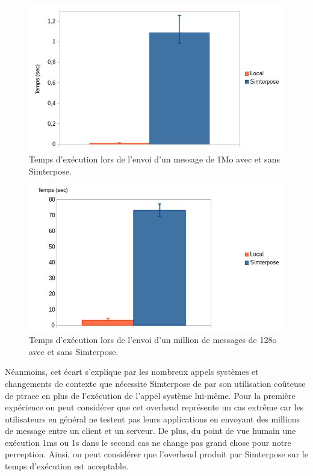 \begin{figure}
  \centering
    \includegraphics[scale=0.5]{mesures/graph/Bigmsg_local.jpg}
    \caption{Temps d'exécution lors de l'envoi d'un message de 1Mo avec et sans Simterpose.}
    \label{Network_Big_Local}
\end{figure}

\begin{figure}
  \centering
    \includegraphics[scale=0.5]{mesures/graph/Littlemsg_local.jpg}
    \caption{Temps d'exécution lors de l'envoi d'un million de messages de 128o avec et sans Simterpose.}
    \label{Network_Little_Local}
\end{figure}
  
Néanmoins, cet écart s'explique par les nombreux appels systèmes et changements de contexte que nécessite Simterpose de par son utilisation coûteuse de ptrace en plus de l'exécution de l'appel système lui-même. Pour la première expérience on peut considérer que cet overhead représente un cas extrême car les utilisateurs en général ne testent pas leurs applications en envoyant des millions de message entre un client et un serveur. De plus, du point de vue humain une exécution 1ms ou 1s dans le second cas ne change pas grand chose pour notre perception. Ainsi, on peut considérer que l'overhead produit par Simterpose sur le temps d'exécution est acceptable.

